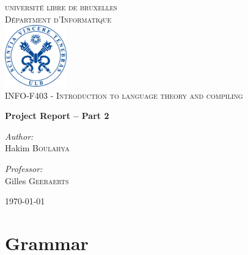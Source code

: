 \documentclass[letterpaper]{article}
\begin{document}
\begin{titlepage}
\begin{center}


\textsc{\LARGE universit\'e libre de bruxelles}\\[1.0cm]
\textsc{\Large D\'epartment d'Informatique}\\[1.5cm]

\includegraphics[width=0.2\textwidth]{image/ulblogo.jpg}~\\[1cm]

\textsc{\Large INFO-F403 - Introduction to language theory and compiling
\\[0.3cm]}

{ \huge \bfseries Project Report – Part 2  \\[0.4cm] }


\noindent
\begin{center} \large

\emph{Author:}\\
Hakim \textsc{Boulahya}\\
\end{center}
\begin{center} \large

\emph{Professor:} \\
Gilles \textsc{Geeraerts}\\

\end{center}

\vfill

{\large \today}

\end{center}
\end{titlepage}

\tableofcontents
\newpage

\section{Grammar}
\end{document}
